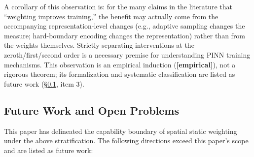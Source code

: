 \documentclass[11pt]{article}
\numberwithin{equation}{section}
\begin{document}
A corollary of this observation is: for the many claims in the literature that ``weighting improves training,'' the benefit may actually come from the accompanying representation-level changes (e.g., adaptive sampling changes the measure; hard-boundary encoding changes the representation) rather than from the weights themselves. Strictly separating interventions at the zeroth/first/second order is a necessary premise for understanding PINN training mechanisms. This observation is an empirical induction (\textbf{[empirical]}), not a rigorous theorem; its formalization and systematic classification are listed as future work (\S\ref{sec:future}, item 3).

\subsection{Future Work and Open Problems}\label{sec:future}

This paper has delineated the capability boundary of spatial static weighting under the above stratification. The following directions exceed this paper's scope and are listed as future work:
\end{document}
